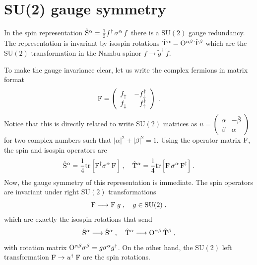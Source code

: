 \section{SU(2) gauge symmetry  }
In the spin representation $ \hat{\mathrm{S}}^\alpha = \frac{1}{2} f^\dagger \, \sigma^\alpha \, f $ there is a $\mathrm{SU}(2)$ gauge redundancy. The representation is invariant by isospin rotations $
    \hat{\mathrm{T}}^\alpha = \mathrm{O}^{\alpha\beta} \,  \hat{\mathrm{T}}^\beta$
which are the $\mathrm{SU}(2)$ transformation in the Nambu spinor $\tilde{f} \longrightarrow \tilde{g}^\dagger \; \tilde{f}$. %


To make the gauge invariance clear, let us write the complex fermions in matrix format \cite{Hermele2007,You2012}
\begin{equation}
    \rmF =\left( \begin{array}{cc}
         f_{\uparrow}^\pd & -f_{\downarrow}^\dagger  \\
         f_{\downarrow}^\pd & \phantom{-}f_{\uparrow}^\dagger  \\
    \end{array} \right) \; .
\end{equation}
Notice that this is directly related to write  $\mathrm{SU}(2)$ matrices as $u=\left(\begin{smallmatrix} \alpha & - \bar{\beta} \\ \beta & \bar\alpha \end{smallmatrix}\right)$ for two complex numbers such that $|\alpha|^2+|\beta|^2=1$.
Using the operator matrix $\mathrm{F}$, the spin and isospin operators are
\begin{equation}
     \hat{\mathrm{S}}^\alpha = \frac{1}{4} \mathrm{tr} \, \Big[  \mathrm{F}^\dagger \sigma^\alpha \, \mathrm{F} \, \Big]
     \; , \quad
     \hat{\mathrm{T}}^\alpha = \frac{1}{4} \mathrm{tr} \, \Big[  \mathrm{F}\,  \sigma^\alpha  \,  \mathrm{F}^\dagger \Big]  \; . \label{eq:A-SFF}
\end{equation}
Now, the gauge symmetry of this representation is immediate.
The spin operators are invariant under right $\mathrm{SU}(2)$ transformations
\begin{equation}
     \mathrm{F} \longrightarrow  \mathrm{F} \; g \;,  \quad g\in\mathrm{SU}(2) \; .
\end{equation}
which are exactly the isospin rotations that send
\begin{equation}
    \hat{\mathrm{S}}^\alpha \longrightarrow  \hat{\mathrm{S}}^\alpha \; , \quad
    \hat{\mathrm{T}}^\alpha \longrightarrow  \mathrm{O}^{\alpha\beta}
 \, \hat{\mathrm{T}}^\beta \; ,
\end{equation}
with rotation matrix  $\mathrm{O}^{\alpha\beta} \sigma^\beta = {g} \sigma^\alpha {g}^\dagger$.
On the other hand, the $\mathrm{SU}(2)$ left transformation $\mathrm{F} \to u^\dagger \; \mathrm{F} $ are the spin rotations.


